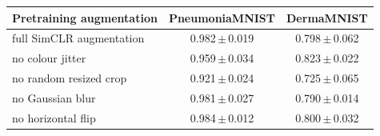 \begin{tabular}{lcc}
\toprule
Pretraining augmentation & PneumoniaMNIST & DermaMNIST \\
\midrule
full SimCLR augmentation & 0.982\,{\tiny $\pm$\,0.019} & 0.798\,{\tiny $\pm$\,0.062} \\
no colour jitter & 0.959\,{\tiny $\pm$\,0.034} & 0.823\,{\tiny $\pm$\,0.022} \\
no random resized crop & 0.921\,{\tiny $\pm$\,0.024} & 0.725\,{\tiny $\pm$\,0.065} \\
no Gaussian blur & 0.981\,{\tiny $\pm$\,0.027} & 0.790\,{\tiny $\pm$\,0.014} \\
no horizontal flip & 0.984\,{\tiny $\pm$\,0.012} & 0.800\,{\tiny $\pm$\,0.032} \\
\bottomrule
\end{tabular}